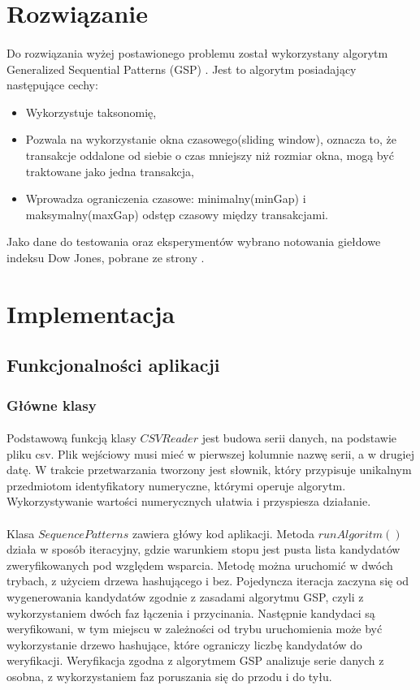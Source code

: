 \documentclass[11pt,a4paper]{article}
\begin{document}
\section{Rozwiązanie}
\label{sec:rozwiazanie}
\paragraph{} Do rozwiązania wyżej postawionego problemu został wykorzystany algorytm Generalized Sequential Patterns (GSP) \cite{bib:GSP}. Jest to algorytm posiadający następujące cechy:
\begin{itemize}
\item Wykorzystuje taksonomię,
\item Pozwala na wykorzystanie okna czasowego(sliding window), oznacza to, że transakcje oddalone od siebie o czas mniejszy niż rozmiar okna, mogą być traktowane jako jedna transakcja,
\item Wprowadza ograniczenia czasowe: minimalny(minGap) i maksymalny(maxGap) odstęp czasowy między transakcjami. 
\end{itemize}
Jako dane do testowania oraz eksperymentów wybrano notowania giełdowe indeksu Dow Jones, pobrane ze strony \cite{bib:DowJones}.

\section{Implementacja}

\subsection{Funkcjonalności aplikacji}
\subsubsection{Główne klasy}
\paragraph{}Podstawową funkcją klasy $CSVReader$ jest budowa serii danych, na podstawie pliku csv. Plik wejściowy musi mieć w pierwszej kolumnie nazwę serii, a w drugiej datę. W trakcie przetwarzania tworzony jest słownik, który przypisuje unikalnym przedmiotom identyfikatory numeryczne, którymi operuje algorytm. Wykorzystywanie wartości numerycznych ułatwia i przyspiesza działanie. 
\paragraph{}Klasa $SequencePatterns$ zawiera główy kod aplikacji. Metoda $runAlgoritm()$ działa w sposób iteracyjny, gdzie warunkiem stopu jest pusta lista kandydatów zweryfikowanych pod względem wsparcia. Metodę można uruchomić w dwóch trybach, z użyciem drzewa hashującego i bez. Pojedyncza iteracja zaczyna się od wygenerowania kandydatów zgodnie z zasadami algorytmu GSP, czyli z wykorzystaniem dwóch faz łączenia i przycinania. Następnie kandydaci są weryfikowani, w tym miejscu w zależności od trybu uruchomienia może być wykorzystanie drzewo hashujące, które ograniczy liczbę kandydatów do weryfikacji. Weryfikacja zgodna z algorytmem GSP analizuje serie danych z osobna, z wykorzystaniem faz poruszania się do przodu i do tyłu. 
\end{document}
